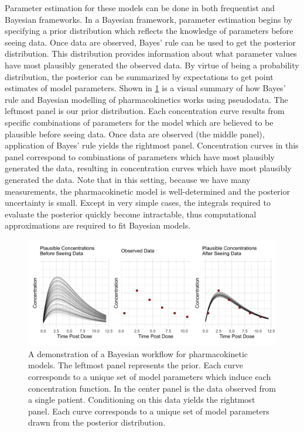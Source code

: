 Parameter estimation for these models can be done in both frequentist and Bayesian frameworks.  In a Bayesian framework, parameter estimation begins by specifying a prior distribution which reflects the knowledge of parameters before seeing data. Once data are observed, Bayes’ rule can be used to get the posterior distribution.  This distribution provides information about what parameter values have most plausibly generated the observed data.  By virtue of being a probability distribution, the posterior can be summarized by expectations to get point estimates of model parameters. Shown in \cref{fig:fig1} is a visual summary of how Bayes’ rule and Bayesian modelling of pharmacokinetics works using pseudodata. The leftmost panel is our prior distribution.  Each concentration curve results from specific combinations of parameters for the model which are believed to be plausible before seeing data.  Once data are observed (the middle panel), application of Bayes’ rule yields the rightmost panel.  Concentration curves in this panel correspond to combinations of parameters which have most plausibly generated the data, resulting in concentration curves which have most plausibly generated the data. Note that in this setting, because we have many measurements, the pharmacokinetic model is well-determined and the posterior uncertainty is small. Except in very simple cases, the integrals required to evaluate the posterior quickly become intractable, thus computational approximations are required to fit Bayesian models.
%
\begin{figure} [h!]
	\centering
	\includegraphics[width=\linewidth]{figs/fig_1}
	\caption{A demonstration of a Bayesian workflow for pharmacokinetic models.  The leftmost panel represents the prior.  Each curve corresponds to a unique set of model parameters which induce each concentration function.  In the center panel is the data observed from a single patient.  Conditioning on this data yields the rightmost panel.  Each curve corresponds to a unique set of model parameters drawn from the posterior distribution.} 
	\label{fig:fig1}
\end{figure}
%

